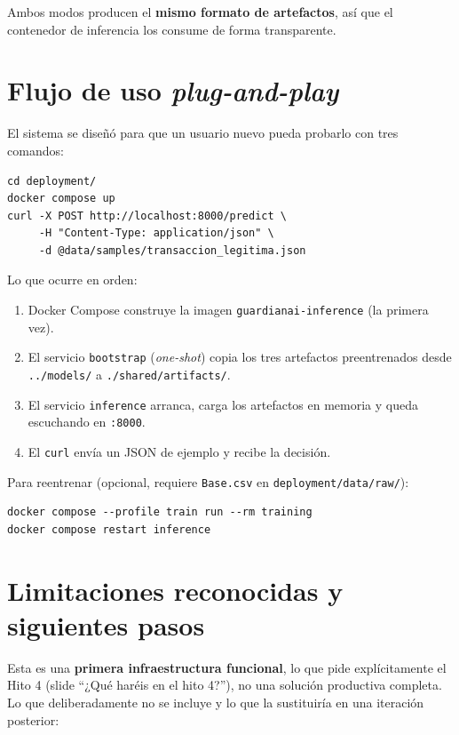 \documentclass[12pt,a4paper]{report}
\begin{document}
Ambos modos producen el \textbf{mismo formato de artefactos}, así que el contenedor de inferencia los consume de forma transparente.

\section{Flujo de uso \textit{plug-and-play}}
\label{sec:hito4-uso}

El sistema se diseñó para que un usuario nuevo pueda probarlo con tres comandos:

\begin{verbatim}
cd deployment/
docker compose up
curl -X POST http://localhost:8000/predict \
     -H "Content-Type: application/json" \
     -d @data/samples/transaccion_legitima.json
\end{verbatim}

Lo que ocurre en orden:
\begin{enumerate}
    \item Docker Compose construye la imagen \texttt{guardianai-inference} (la primera vez).
    \item El servicio \texttt{bootstrap} (\textit{one-shot}) copia los tres artefactos preentrenados desde \texttt{../models/} a \texttt{./shared/artifacts/}.
    \item El servicio \texttt{inference} arranca, carga los artefactos en memoria y queda escuchando en \texttt{:8000}.
    \item El \texttt{curl} envía un JSON de ejemplo y recibe la decisión.
\end{enumerate}

Para reentrenar (opcional, requiere \texttt{Base.csv} en \texttt{deployment/data/raw/}):
\begin{verbatim}
docker compose --profile train run --rm training
docker compose restart inference
\end{verbatim}

\section{Limitaciones reconocidas y siguientes pasos}
\label{sec:hito4-limitaciones}

Esta es una \textbf{primera infraestructura funcional}, lo que pide explícitamente el Hito 4 (slide ``¿Qué haréis en el hito 4?''), no una solución productiva completa. Lo que deliberadamente no se incluye y lo que la sustituiría en una iteración posterior:
\end{document}
